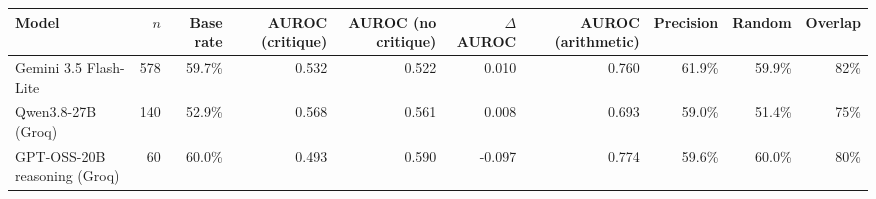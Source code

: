 \begin{tabular}{lrrrrrrrrr}
\toprule
Model & $n$ & Base rate & AUROC (critique) & AUROC (no critique) & $\Delta$ AUROC & AUROC (arithmetic) & Precision & Random & Overlap \\
\midrule
Gemini 3.5 Flash-Lite & 578 & 59.7\% & 0.532 & 0.522 & 0.010 & 0.760 & 61.9\% & 59.9\% & 82\% \\
Qwen3.8-27B (Groq) & 140 & 52.9\% & 0.568 & 0.561 & 0.008 & 0.693 & 59.0\% & 51.4\% & 75\% \\
GPT-OSS-20B reasoning (Groq) & 60 & 60.0\% & 0.493 & 0.590 & -0.097 & 0.774 & 59.6\% & 60.0\% & 80\% \\
\bottomrule
\end{tabular}
